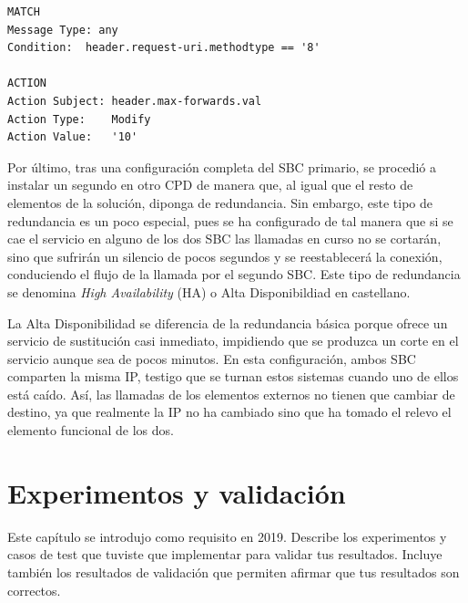 \documentclass[a4paper, 12pt]{book}
\begin{document}
\begin{verbatim}
MATCH
Message Type: any		
Condition:	header.request-uri.methodtype == '8'

ACTION
Action Subject:	header.max-forwards.val	
Action Type:	Modify	
Action Value:	'10'
\end{verbatim}

Por último, tras una configuración completa del SBC primario, se procedió a instalar un segundo en otro CPD de manera que, al igual que el resto de elementos de la solución, diponga de redundancia. Sin embargo, este tipo de redundancia es un poco especial, pues se ha configurado de tal manera que si se cae el servicio en alguno de los dos SBC las llamadas en curso no se cortarán, sino que sufrirán un silencio de pocos segundos y se reestablecerá la conexión, conduciendo el flujo de la llamada por el segundo SBC. Este tipo de redundancia se denomina \emph{High Availability} (HA) o Alta Disponibildiad en castellano.

La Alta Disponibilidad se diferencia de la redundancia básica porque ofrece un servicio de sustitución casi inmediato, impidiendo que se produzca un corte en el servicio aunque sea de pocos minutos. En esta configuración, ambos SBC comparten la misma IP, testigo que se turnan estos sistemas cuando uno de ellos está caído. Así, las llamadas de los elementos externos no tienen que cambiar de destino, ya que realmente la IP no ha cambiado sino que ha tomado el relevo el elemento funcional de los dos.



\cleardoublepage
\chapter{Experimentos y validación}

Este capítulo se introdujo como requisito en 2019.
Describe los experimentos y casos de test que tuviste que implementar para validar tus resultados.
Incluye también los resultados de validación que permiten afirmar que tus resultados son correctos.


\end{document}
